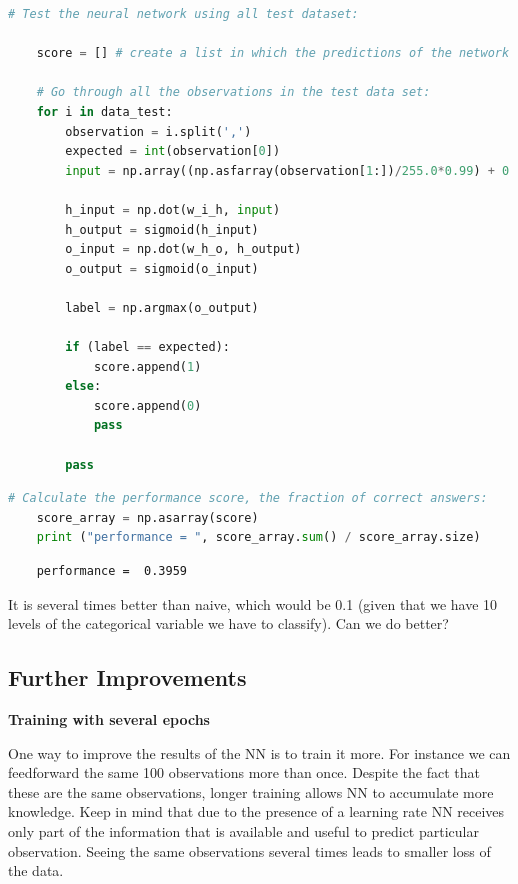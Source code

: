 \begin{lstlisting}[language=Python]   
    # Test the neural network using all test dataset:
    
    score = [] # create a list in which the predictions of the network will we saved.
    
    # Go through all the observations in the test data set:
    for i in data_test:
        observation = i.split(',')
        expected = int(observation[0])
        input = np.array((np.asfarray(observation[1:])/255.0*0.99) + 0.01, ndmin=2).T
    
        h_input = np.dot(w_i_h, input)
        h_output = sigmoid(h_input)
        o_input = np.dot(w_h_o, h_output)
        o_output = sigmoid(o_input)
    
        label = np.argmax(o_output)
    
        if (label == expected):
            score.append(1)
        else:
            score.append(0)
            pass
        
        pass
\end{lstlisting}

\begin{lstlisting}[language=Python]   
    # Calculate the performance score, the fraction of correct answers:
    score_array = np.asarray(score)
    print ("performance = ", score_array.sum() / score_array.size)
    \end{lstlisting}

\begin{lstlisting}
    performance =  0.3959
\end{lstlisting}

  It is several times better than naive, which would be 0.1 (given that we have 10 levels of the categorical variable we have to classify). Can we do better?
  
\subsection{Further Improvements}

\textbf{Training with several epochs}
   
One way to improve the results of the NN is to train it more. For instance we can feedforward the same 100 observations more than once. Despite the fact that these are the same observations, longer training allows NN to accumulate more knowledge. Keep in mind that due to the presence of a learning rate NN receives only part of the information that is available and useful to predict particular observation. Seeing the same observations several times leads to smaller loss of the data.
   
